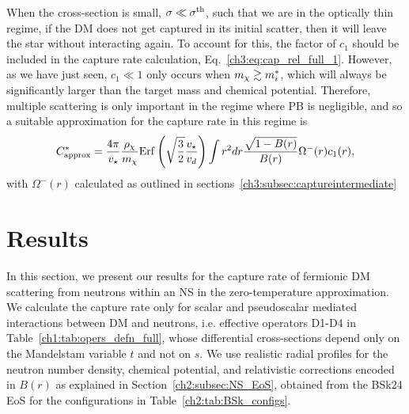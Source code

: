 When the cross-section is small, $\sigma\ll\sigma^{\rm th}$, such that we are in the optically thin regime, if the DM does not get captured in its initial scatter, then it will leave the star without interacting again. To account for this, the factor of $c_1$ should be included in the capture rate calculation, Eq.~\ref{ch3:eq:cap_rel_full_1}. However, as we have just seen, $c_1\ll1$ only occurs when $m_\chi\gtrsim m_i^*$, which will always be significantly larger than the target mass and chemical potential. Therefore, multiple scattering is only important in the regime where PB is negligible, and so a suitable approximation for the capture rate in this regime is
\begin{equation}
    C_\mathrm{approx}^* = \frac{4\pi}{v_\star}\frac{\rho_\chi}{m_\chi}{\rm Erf}\left(\sqrt{\frac{3}{2}}\frac{v_\star}{v_d}\right)  \int  r^2 dr  \frac{\sqrt{1-B(r)}}{B(r)}\Omega^{-}(r) c_1(r),
    \label{ch3:eq:capturesimplelargem}
\end{equation}
with $\Omega^-(r)$ calculated as outlined in sections~\ref{ch3:subsec:captureintermediate}
    
\section{Results}
\label{ch3:sec:results}


In this section, we present our results for the capture rate of fermionic DM scattering from neutrons within an NS in the zero-temperature approximation. We calculate the capture rate only for scalar and pseudoscalar mediated interactions between DM and neutrons, i.e. effective operators D1-D4 in Table~\ref{ch1:tab:opers_defn_full}, whose differential cross-sections depend only on the Mandelstam variable $t$ and not on $s$. 
We use realistic radial profiles for the neutron number density, chemical potential, and relativistic corrections encoded in $B(r)$ as explained in Section~\ref{ch2:subsec:NS_EoS}, obtained from the BSk24 EoS for the configurations in Table~\ref{ch2:tab:BSk_configs}. 




